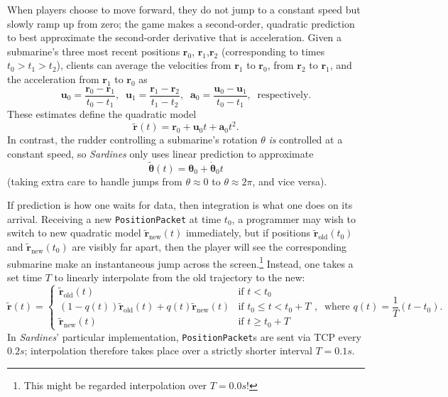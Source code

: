 \documentclass[a4paper, 10pt]{article}
\begin{document}
\begin{flushleft}
\vspace{5pt}\noindent
When players choose to move forward, they do not jump to a constant speed but slowly ramp up from zero; the game makes a second-order, quadratic prediction to best approximate the second-order derivative that is acceleration. Given a submarine's three most recent positions $\mathbf{r}_0$, $\mathbf{r}_1$,$\mathbf{r}_2$ (corresponding to times $t_0 > t_1 > t_2$), clients can average the velocities from $\mathbf{r}_1$ to $\mathbf{r}_0$, from $\mathbf{r}_2$ to $\mathbf{r}_1$, and the acceleration from $\mathbf{r}_1$ to $\mathbf{r}_0$ as
$$\mathbf{u}_0 = \frac{\mathbf{r}_0-\mathbf{r}_1}{t_0-t_1}, \;\; \mathbf{u}_1 = \frac{\mathbf{r}_1-\mathbf{r}_2}{t_1-t_2}, \;\; \mathbf{a}_0 = \frac{\mathbf{u}_0-\mathbf{u}_1}{t_0-t_1}, \;\; \textrm{respectively.}$$
These estimates define the quadratic model
$$ \mathbf{\tilde{r}}(t) = \mathbf{r}_0+\mathbf{u}_0t+\mathbf{a}_0t^2.$$
In contrast, the rudder controlling a submarine's rotation $\theta$ \textit{is} controlled at a constant speed, so \textit{Sardines} only uses linear prediction to approximate
$$\mathbf{\tilde{\theta}}(t) = \mathbf{\theta}_0+\mathbf{\dot{\theta}}_0t$$
(taking extra care to handle jumps from $\theta \approx 0$ to $\theta \approx 2\pi$, and vice versa).


\vspace{5pt}\noindent
If prediction is how one waits for data, then integration is what one does on its arrival. Receiving a new \texttt{PositionPacket} at time $t_0$, a programmer may wish to switch to new quadratic model $\mathbf{\tilde{r}}_{\textrm{new}}(t)$ immediately, but if positions $\mathbf{\tilde{r}}_{\textrm{old}}(t_0)$ and $\mathbf{\tilde{r}}_{\textrm{new}}(t_0)$ are visibly far apart, then the player will see the corresponding submarine make an instantaneous jump across the screen.\footnote{This might be regarded interpolation over $T = 0.0s$!} Instead, one takes a set time $T$ to linearly interpolate from the old trajectory to the new:
$$\mathbf{\tilde{r}}(t) = \begin{cases} 
\mathbf{\tilde{r}}_{\textrm{old}}(t) & \textrm{if $t < t_0$} \\
(1-q(t))\mathbf{\tilde{r}}_{\textrm{old}}(t) + q(t)\mathbf{\tilde{r}}_{\textrm{new}}(t) & \textrm{if $t_0 \leq t < t_0+T$} \\
\mathbf{\tilde{r}}_{\textrm{new}}(t) & \textrm{if $t \geq t_0+T$}
\end{cases}, \;\; \textrm{where $q(t) = \frac{1}{T}\left(t-t_0\right)$.}$$
In \textit{Sardines}' particular implementation, \texttt{PositionPacket}s are sent via TCP every $0.2s$; interpolation therefore takes place over a strictly shorter interval $T = 0.1s$. 


\end{flushleft}
\end{document}
